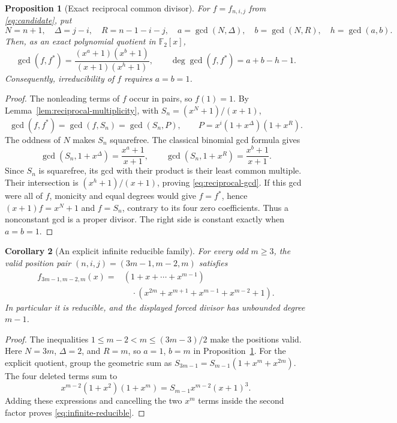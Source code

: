 \documentclass[11pt]{article}
\newtheorem{proposition}{Proposition}[section]
\newtheorem{corollary}[proposition]{Corollary}
\theoremstyle{definition}
\theoremstyle{remark}
\begin{document}
\begin{proposition}[Exact reciprocal common divisor]
\label{prop:reciprocal-gcd}
For \(f=f_{n,i,j}\) from \eqref{eq:candidate}, put
\[
 N=n+1,\quad \Delta=j-i,\quad R=n-1-i-j,\quad
 a=\gcd(N,\Delta),\quad b=\gcd(N,R),\quad h=\gcd(a,b).
\]
Then, as an exact polynomial quotient in \(\mathbb F_2[x]\),
\begin{equation}\label{eq:reciprocal-gcd}
 \gcd(f,f^*)=
 \frac{(x^a+1)(x^b+1)}{(x+1)(x^h+1)},\qquad
 \deg\gcd(f,f^*)=a+b-h-1.
\end{equation}
Consequently, irreducibility of \(f\) requires \(a=b=1\).
\end{proposition}
\begin{proof}
The nonleading terms of \(f\) occur in pairs, so \(f(1)=1\).
By Lemma~\ref{lem:reciprocal-multiplicity}, with
\(S_n=(x^N+1)/(x+1)\),
\[
 \gcd(f,f^*)=\gcd(f,S_n)=\gcd(S_n,P),\qquad
 P=x^i(1+x^\Delta)(1+x^R).
\]
The oddness of \(N\) makes \(S_n\) squarefree. The classical binomial
gcd formula gives
\[
 \gcd(S_n,1+x^\Delta)=\frac{x^a+1}{x+1},\qquad
 \gcd(S_n,1+x^R)=\frac{x^b+1}{x+1}.
\]
Since \(S_n\) is squarefree, its gcd with their product is their
least common multiple. Their intersection is
\((x^h+1)/(x+1)\), proving \eqref{eq:reciprocal-gcd}.
If this gcd were all of \(f\), monicity and equal degrees would give
\(f=f^*\), hence \((x+1)f=x^N+1\) and \(f=S_n\), contrary to its
four zero coefficients. Thus a nonconstant gcd is a proper divisor.
The right side is constant exactly when \(a=b=1\).
\end{proof}

\begin{corollary}[An explicit infinite reducible family]
\label{cor:infinite-reducible}
For every odd \(m\ge3\), the valid position pair
\((n,i,j)=(3m-1,m-2,m)\) satisfies
\begin{equation}\label{eq:infinite-reducible}
\begin{split}
 f_{3m-1,m-2,m}(x)
 ={}&(1+x+\cdots+x^{m-1})\\
 &\quad\cdot(x^{2m}+x^{m+1}+x^{m-1}+x^{m-2}+1).
\end{split}
\end{equation}
In particular it is reducible, and the displayed forced divisor
has unbounded degree \(m-1\).
\end{corollary}
\begin{proof}
The inequalities \(1\le m-2<m\le(3m-3)/2\) make the positions valid.
Here \(N=3m\), \(\Delta=2\), and \(R=m\), so
\(a=1\), \(b=m\) in Proposition~\ref{prop:reciprocal-gcd}.
For the explicit quotient, group the geometric sum as
\(S_{3m-1}=S_{m-1}(1+x^m+x^{2m})\). The four deleted terms sum to
\[
 x^{m-2}(1+x^2)(1+x^m)=S_{m-1}x^{m-2}(x+1)^3.
\]
Adding these expressions and cancelling the two \(x^m\) terms
inside the second factor proves \eqref{eq:infinite-reducible}.
\end{proof}
\end{document}
